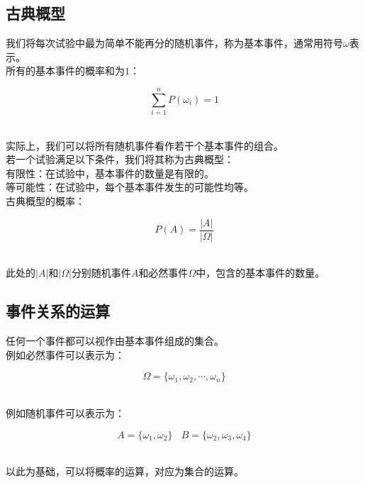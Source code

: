 \documentclass[UTF8]{ctexart}
\begin{document}
\subsection{古典概型}
    我们将每次试验中最为简单不能再分的随机事件，称为基本事件，通常用符号$\omega$表示。\\[3mm]
    所有的基本事件的概率和为$1$：
    \begin{large}
        \begin{equation*}
            \sum_{i=1}^{n}P(\omega_i)=1
        \end{equation*}
    \end{large}\\
    实际上，我们可以将所有随机事件看作若干个基本事件的组合。\\[6mm]
    若一个试验满足以下条件，我们将其称为古典概型：\\[3mm]
    有限性：在试验中，基本事件的数量是有限的。\\[3mm]
    等可能性：在试验中，每个基本事件发生的可能性均等。\\[4mm]
    古典概型的概率：
    \begin{large}
        \begin{equation*}
            P(A)=\frac{|A|}{|\Omega|}
        \end{equation*}
    \end{large}\\
    此处的$|A|$和$|\Omega|$分别随机事件$A$和必然事件$\Omega$中，包含的基本事件的数量。

\newpage

\subsection{事件关系的运算}
    任何一个事件都可以视作由基本事件组成的集合。\\[3mm]
    例如必然事件可以表示为：
    \begin{large}
        \begin{equation*}
            \Omega=\{\omega_1,\omega_2,\cdots,\omega_n\}
        \end{equation*}
    \end{large}\\
    例如随机事件可以表示为：
    \begin{large}
        \begin{equation*}
            A=\{\omega_1,\omega_2\}~~~~B=\{\omega_2,\omega_3,\omega_4\}
        \end{equation*}
    \end{large}\\
    以此为基础，可以将概率的运算，对应为集合的运算。\\
\end{document}
